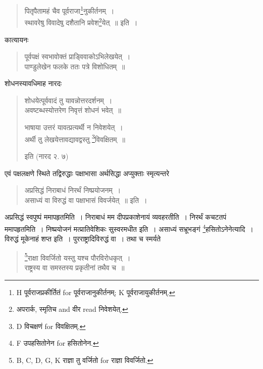 \documentclass[11pt, openany]{book}
\begin{document}
\newpage
{}

\begin{quote}
{\vy पितृपैतामहं चैव पूर्वराजा\renewcommand{\thefootnote}{1}\footnote{H पूर्वराजप्रकीर्तितं for पूर्वराजानुकीर्तनम्; K पूर्वराजायुकीर्तनम्.}नुकीर्तनम्~।\\
स्थावरेषु विवादेषु दशैतानि प्रवेश\renewcommand{\thefootnote}{2}\footnote{अपरार्क, स्मृतिच and वीर read निवेशयेत्.}येत्~॥} इति~।
\end{quote}

कात्यायनः

\begin{quote}
{\vy पूर्वपक्षं स्वभावोक्तं प्राड्विवाकोऽभिलेखयेत्~।\\
पाण्डुलेखेन फलके ततः पत्रे विशोधितम्~॥}
\end{quote}

शोधनस्यावधिमाह नारदः 

\begin{quote}
{\vy शोधयेत्पूर्ववादं तु यावन्नोत्तरदर्शनम्~।\\
अवष्टब्धस्योत्तरेण निवृत्तं शोधनं भवेत्~॥

भाषाया उत्तरं यावत्प्रत्यर्थी न निवेशयेत्~।\\
अर्थी तु लेखयेत्तावद्यावद्वस्तु \renewcommand{\thefootnote}{3}\footnote{D विचक्षणं for विवक्षितम्.}विवक्षितम्~॥} इति (नारद २. ७)
\end{quote}

एवं पक्षलक्षणे स्थिते तद्विरुद्धाः पक्षाभासा अर्थसिद्धा अप्युक्ताः स्मृत्यन्तरे

\begin{quote}
{\vy अप्रसिद्धं निराबाधं निरर्थं निष्प्रयोजनम्~।\\
असाध्यं वा विरुद्धं वा पक्षाभासं विवर्जयेत्~॥} इति~।
\end{quote}

अप्रसिद्धं स्वपुष्पं ममापहृतमिति~। निराबाधं मम दीपप्रकाशेनायं व्यवहरतीति~। निरर्थं कचटतपं ममापहृतमिति~। निष्प्रयोजनं मत्प्रातिवेशिकः सुस्वरमधीत इति~। असाध्यं सभ्रूभङ्गं \renewcommand{\thefootnote}{4}\footnote{F उपहसितोनेन for हसितोनेन.}हसितोऽनेनेत्यादि~। विरुद्धं मूकेनाहं शप्त इति~। पुरराष्ट्रादिविरुद्धं वा~। तथा च स्मर्यते

\begin{quote}
{\vy \renewcommand{\thefootnote}{5}\footnote{B, C, D, G, K राज्ञा तु वर्जितो for राज्ञा विवर्जितो.}राक्षा विवर्जितो यस्तु यश्च पौरविरोधकृत्~।\\
राष्ट्रस्य वा समस्तस्य प्रकृतीनां तथैव च~॥}
\end{quote}
\end{document}
